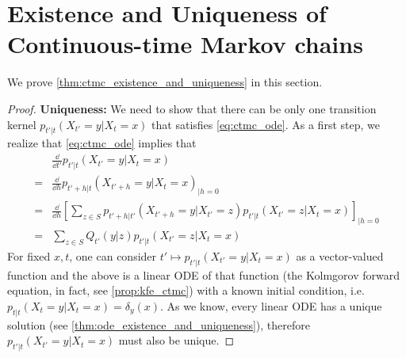 \section{Existence and Uniqueness of Continuous-time Markov chains}
\label{appendix:existence_uniquenss_ctmcs}
We prove \cref{thm:ctmc_existence_and_uniqueness} in this section.
\begin{proof}
\textbf{Uniqueness:} We need to show that there can be only one transition kernel $p_{t'|t}(X_{t'}=y|X_{t}=x)$ that satisfies \cref{eq:ctmc_ode}. As a first step, we realize that \cref{eq:ctmc_ode} implies that
\begin{align}
    &\frac{\dd}{\dd t'}p_{t'|t}(X_{t'}=y|X_{t}=x)\\
=&\frac{\dd}{\dd h}p_{t'+h|t}(X_{t'+h}=y|X_{t}=x)_{|h=0}\\
=&\frac{\dd}{\dd h}\left[\sum\limits_{z\in S}p_{t'+h|t'}(X_{t'+h}=y|X_{t'}=z)p_{t'|t}(X_{t'}=z|X_{t}=x)\right]_{|h=0}\\
=&\sum\limits_{z\in S}Q_{t'}(y|z)p_{t'|t}(X_{t'}=z|X_{t}=x)
\end{align}
For fixed $x,t$, one can consider $t'\mapsto p_{t'|t}(X_{t'}=y|X_t=x)$ as a vector-valued function and the above is a linear ODE of that function (the Kolmgorov forward equation, in fact, see \cref{prop:kfe_ctmc}) with a known initial condition, i.e. $p_{t|t}(X_{t}=y|X_{t}=x)=\delta_{y}(x)$. As we know, every linear ODE has a unique solution (see \cref{thm:ode_existence_and_uniqueness}), therefore $p_{t'|t}(X_{t'}=y|X_{t}=x)$ must also be unique.


\end{proof}
